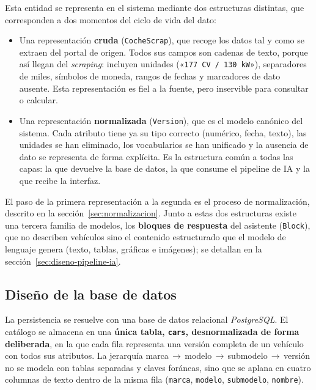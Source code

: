 Esta entidad se representa en el sistema mediante dos estructuras distintas, que
corresponden a dos momentos del ciclo de vida del dato:

\begin{itemize}
    \item Una representación \textbf{cruda} (\texttt{CocheScrap}), que recoge los
    datos tal y como se extraen del portal de origen. Todos sus campos son
    cadenas de texto, porque así llegan del \emph{scraping}: incluyen unidades
    («\texttt{177 CV / 130 kW}»), separadores de miles, símbolos de moneda,
    rangos de fechas y marcadores de dato ausente. Esta representación es fiel a
    la fuente, pero inservible para consultar o calcular.

    \item Una representación \textbf{normalizada} (\texttt{Version}), que es el
    modelo canónico del sistema. Cada atributo tiene ya su tipo correcto
    (numérico, fecha, texto), las unidades se han eliminado, los vocabularios se
    han unificado y la ausencia de dato se representa de forma explícita. Es la
    estructura común a todas las capas: la que devuelve la base de datos, la que
    consume el pipeline de IA y la que recibe la interfaz.
\end{itemize}

El paso de la primera representación a la segunda es el proceso de normalización,
descrito en la sección~\ref{sec:normalizacion}. Junto a estas dos estructuras
existe una tercera familia de modelos, los \textbf{bloques de respuesta} del
asistente (\texttt{Block}), que no describen vehículos sino el contenido
estructurado que el modelo de lenguaje genera (texto, tablas, gráficas e
imágenes); se detallan en la sección~\ref{sec:diseno-pipeline-ia}.

\subsection{Diseño de la base de datos}
\label{sec:diseno-bd}

La persistencia se resuelve con una base de datos relacional \emph{PostgreSQL}.
El catálogo se almacena en una \textbf{única tabla, \texttt{cars}, desnormalizada
de forma deliberada}, en la que cada fila representa una versión completa de un
vehículo con todos sus atributos. La jerarquía
marca\,$\to$\,modelo\,$\to$\,submodelo\,$\to$\,versión no se modela con tablas
separadas y claves foráneas, sino que se aplana en cuatro columnas de texto
dentro de la misma fila (\texttt{marca}, \texttt{modelo}, \texttt{submodelo},
\texttt{nombre}).

